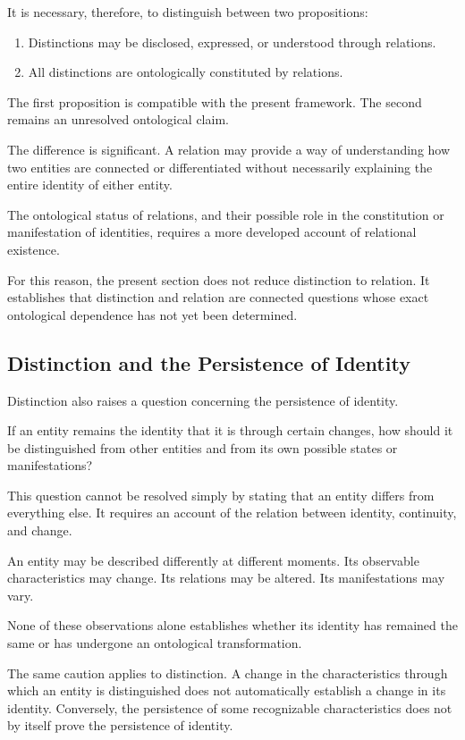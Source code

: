 It is necessary, therefore, to distinguish
between two propositions:

\begin{enumerate}
    \item Distinctions may be disclosed, expressed,
    or understood through relations.

    \item All distinctions are ontologically
    constituted by relations.
\end{enumerate}

The first proposition is compatible with the
present framework. The second remains an
unresolved ontological claim.

The difference is significant. A relation may
provide a way of understanding how two entities
are connected or differentiated without
necessarily explaining the entire identity of
either entity.

The ontological status of relations, and their
possible role in the constitution or manifestation
of identities, requires a more developed account
of relational existence.

For this reason, the present section does not
reduce distinction to relation. It establishes
that distinction and relation are connected
questions whose exact ontological dependence
has not yet been determined.

\subsection{Distinction and the Persistence of Identity}

Distinction also raises a question concerning
the persistence of identity.

If an entity remains the identity that it is
through certain changes, how should it be
distinguished from other entities and from
its own possible states or manifestations?

This question cannot be resolved simply by
stating that an entity differs from everything
else. It requires an account of the relation
between identity, continuity, and change.

An entity may be described differently at
different moments. Its observable characteristics
may change. Its relations may be altered.
Its manifestations may vary.

None of these observations alone establishes
whether its identity has remained the same
or has undergone an ontological transformation.

The same caution applies to distinction.
A change in the characteristics through which
an entity is distinguished does not automatically
establish a change in its identity. Conversely,
the persistence of some recognizable characteristics
does not by itself prove the persistence of
identity.


